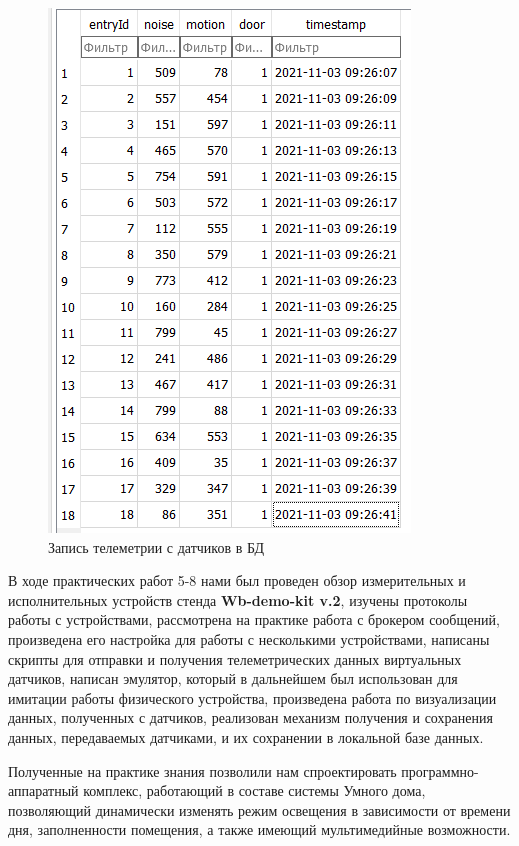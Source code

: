 \documentclass[a4paper,14pt]{extarticle}
\newcommand{\stend}{\textbf{Wb-demo-kit v.2}}
\begin{document}
\begin{problem}
\begin{figure}[htpb]
	\centering
	\includegraphics[width=0.8\linewidth]{images/task8-dop-db}
	\caption{Запись телеметрии с датчиков в БД}
	\label{fig:task8-dop-db}
\end{figure}

	
\end{problem}
	

\newpage

В ходе практических работ 5-8 нами был проведен обзор измерительных и исполнительных устройств стенда \stend, изучены протоколы работы с устройствами, рассмотрена на практике работа с брокером сообщений, произведена его настройка для работы с несколькими устройствами, написаны скрипты для отправки и получения телеметрических данных виртуальных датчиков, написан эмулятор, который в дальнейшем был использован для имитации работы физического устройства, произведена работа по визуализации данных, полученных с датчиков, реализован механизм получения и сохранения данных, передаваемых датчиками, и их сохранении в локальной базе данных. 

Полученные на практике знания позволили нам спроектировать программно-аппаратный комплекс, работающий в составе системы Умного дома, позволяющий динамически изменять режим освещения в зависимости от времени дня, заполненности помещения, а также имеющий мультимедийные возможности.
\newpage
\end{document}

